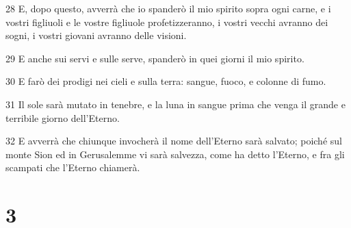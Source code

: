 \par 28 E, dopo questo, avverrà che io spanderò il mio spirito sopra ogni carne, e i vostri figliuoli e le vostre figliuole profetizzeranno, i vostri vecchi avranno dei sogni, i vostri giovani avranno delle visioni.
\par 29 E anche sui servi e sulle serve, spanderò in quei giorni il mio spirito.
\par 30 E farò dei prodigi nei cieli e sulla terra: sangue, fuoco, e colonne di fumo.
\par 31 Il sole sarà mutato in tenebre, e la luna in sangue prima che venga il grande e terribile giorno dell'Eterno.
\par 32 E avverrà che chiunque invocherà il nome dell'Eterno sarà salvato; poiché sul monte Sion ed in Gerusalemme vi sarà salvezza, come ha detto l'Eterno, e fra gli scampati che l'Eterno chiamerà.

\chapter{3}

